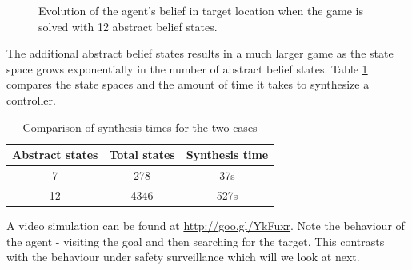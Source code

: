 \begin{figure}
\begin{minipage}{5.0cm}
	\end{minipage}
	
	
	\caption{Evolution of the agent's belief in target location when the game is solved with 12 abstract belief states.
	}
	\label{fig:case1fineexp}
	
\end{figure}




The additional abstract belief states results in a much larger game as the state space grows exponentially in the number of abstract belief states. Table \ref{tab:exp1} compares the state spaces and the amount of time it takes to synthesize a controller.


\begin{table}[h!]
	\centering
	\begin{tabular}{c|c|c}
		Abstract states & Total states & Synthesis time \\ \hline \hline
		7 & 278 & 37s \\ 
		12 & 4346 & 527s \\ 
	\end{tabular}\caption{Comparison of synthesis times for the two cases} \label{tab:exp1}
\end{table}


A video simulation can be found at \url{http://goo.gl/YkFuxr}. Note the behaviour of the agent - visiting the goal and then searching for the target. This contrasts with the behaviour under safety surveillance which will we look at next.

